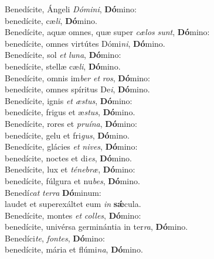 \evenverse Benedícite, Ángeli \textit{Dó}\textit{mi}\textit{ni}, \textbf{Dó}mino:~\*\\
\evenverse benedícite, cæ\textit{li}, \textbf{Dó}mino.\\
\oddverse Benedícite, aquæ omnes, quæ super \textit{cæ}\textit{los} \textit{sunt}, \textbf{Dó}mino:~\*\\
\oddverse benedícite, omnes virtútes Dómi\textit{ni}, \textbf{Dó}mino.\\
\evenverse Benedícite, sol \textit{et} \textit{lu}\textit{na}, \textbf{Dó}mino:~\*\\
\evenverse benedícite, stellæ cæ\textit{li}, \textbf{Dó}mino.\\
\oddverse Benedícite, omnis im\textit{ber} \textit{et} \textit{ros}, \textbf{Dó}mino:~\*\\
\oddverse benedícite, omnes spíritus De\textit{i}, \textbf{Dó}mino.\\
\evenverse Benedícite, ignis \textit{et} \textit{æ}\textit{stus}, \textbf{Dó}mino:~\*\\
\evenverse benedícite, frigus et æ\textit{stus}, \textbf{Dó}mino.\\
\oddverse Benedícite, rores et \textit{pru}\textit{í}\textit{na}, \textbf{Dó}mino:~\*\\
\oddverse benedícite, gelu et fri\textit{gus}, \textbf{Dó}mino.\\
\evenverse Benedícite, glácies \textit{et} \textit{ni}\textit{ves}, \textbf{Dó}mino:~\*\\
\evenverse benedícite, noctes et di\textit{es}, \textbf{Dó}mino.\\
\oddverse Benedícite, lux et \textit{té}\textit{ne}\textit{bræ}, \textbf{Dó}mino:~\*\\
\oddverse benedícite, fúlgura et nu\textit{bes}, \textbf{Dó}mino.\\
\evenverse Benedí\textit{cat} \textit{ter}\textit{ra} \textbf{Dó}minum:~\*\\
\evenverse laudet et superexáltet eum \textit{in} \textbf{sǽ}cula.\\
\oddverse Benedícite, montes \textit{et} \textit{col}\textit{les}, \textbf{Dó}mino:~\*\\
\oddverse benedícite, univérsa germinántia in ter\textit{ra}, \textbf{Dó}mino.\\
\evenverse Benedíci\textit{te}, \textit{fon}\textit{tes}, \textbf{Dó}mino:~\*\\
\evenverse benedícite, mária et flúmi\textit{na}, \textbf{Dó}mino.\\

